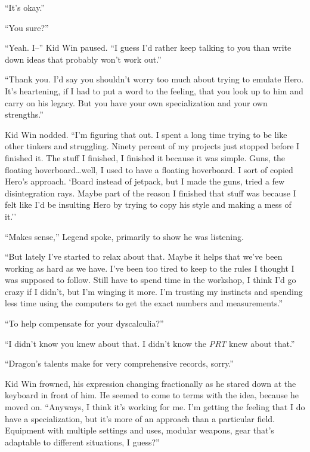 ``It's okay.''



``You sure?''



``Yeah.  I--'' Kid Win paused.  ``I guess I'd rather keep talking to you than write down ideas that probably won't work out.''



``Thank you.  I'd say you shouldn't worry too much about trying to emulate Hero.  It's heartening, if I had to put a word to the feeling, that you look up to him and carry on his legacy.  But you have your own specialization and your own strengths.''



Kid Win nodded.  ``I'm figuring that out.  I spent a long time trying to be like other tinkers and struggling.  Ninety percent of my projects just stopped before I finished it.  The stuff I finished, I finished it because it was simple.  Guns, the floating hoverboard\ldots well, I used to have a floating hoverboard.  I sort of copied Hero's approach.  `Board instead of jetpack, but I made the guns, tried a few disintegration rays.  Maybe part of the reason I finished that stuff was because I felt like I'd be insulting Hero by trying to copy his style and making a mess of it.''



``Makes sense,'' Legend spoke, primarily to show he was listening.



``But lately I've started to relax about that.  Maybe it helps that we've been working as hard as we have.  I've been too tired to keep to the rules I thought I was supposed to follow.  Still have to spend time in the workshop, I think I'd go crazy if I didn't, but I'm winging it more.  I'm trusting my instincts and spending less time using the computers to get the exact numbers and measurements.''



``To help compensate for your dyscalculia?''



``I didn't know you knew about that.  I didn't know the \emph{PRT} knew about that.''



``Dragon's talents make for very comprehensive records, sorry.''



Kid Win frowned, his expression changing fractionally as he stared down at the keyboard in front of him.  He seemed to come to terms with the idea, because he moved on. ``Anyways, I think it's working for me.  I'm getting the feeling that I do have a specialization, but it's more of an approach than a particular field.  Equipment with multiple settings and uses, modular weapons, gear that's adaptable to different situations, I guess?''



